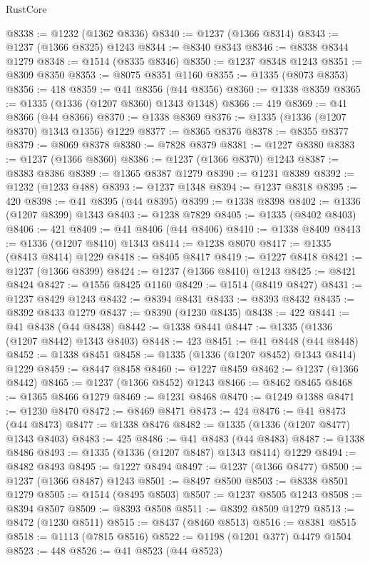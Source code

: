 \begin{lexlean}{RustCore}
\begin{coremodule}
@8338 := @1232 (@1362 @8336)
@8340 := @1237 (@1366 @8314)
@8343 := @1237 (@1366 @8325) @1243
@8344 := @8340 @8343
@8346 := @8338 @8344 @1279
@8348 := @1514 (@8335 @8346)
@8350 := @1237 @8348 @1243
@8351 := @8309 @8350
@8353 := @8075 @8351 @1160
@8355 := @1335 (@8073 @8353)
@8356 := 418
@8359 := @41 @8356 (@44 @8356)
@8360 := @1338 @8359
@8365 := @1335 (@1336 (@1207 @8360) @1343 @1348)
@8366 := 419
@8369 := @41 @8366 (@44 @8366)
@8370 := @1338 @8369
@8376 := @1335 (@1336 (@1207 @8370) @1343 @1356) @1229
@8377 := @8365 @8376
@8378 := @8355 @8377
@8379 := @8069 @8378
@8380 := @7828 @8379
@8381 := @1227 @8380
@8383 := @1237 (@1366 @8360)
@8386 := @1237 (@1366 @8370) @1243
@8387 := @8383 @8386
@8389 := @1365 @8387 @1279
@8390 := @1231 @8389
@8392 := @1232 (@1233 @488)
@8393 := @1237 @1348
@8394 := @1237 @8318
@8395 := 420
@8398 := @41 @8395 (@44 @8395)
@8399 := @1338 @8398
@8402 := @1336 (@1207 @8399) @1343
@8403 := @1238 @7829
@8405 := @1335 (@8402 @8403)
@8406 := 421
@8409 := @41 @8406 (@44 @8406)
@8410 := @1338 @8409
@8413 := @1336 (@1207 @8410) @1343
@8414 := @1238 @8070
@8417 := @1335 (@8413 @8414) @1229
@8418 := @8405 @8417
@8419 := @1227 @8418
@8421 := @1237 (@1366 @8399)
@8424 := @1237 (@1366 @8410) @1243
@8425 := @8421 @8424
@8427 := @1556 @8425 @1160
@8429 := @1514 (@8419 @8427)
@8431 := @1237 @8429 @1243
@8432 := @8394 @8431
@8433 := @8393 @8432
@8435 := @8392 @8433 @1279
@8437 := @8390 (@1230 @8435)
@8438 := 422
@8441 := @41 @8438 (@44 @8438)
@8442 := @1338 @8441
@8447 := @1335 (@1336 (@1207 @8442) @1343 @8403)
@8448 := 423
@8451 := @41 @8448 (@44 @8448)
@8452 := @1338 @8451
@8458 := @1335 (@1336 (@1207 @8452) @1343 @8414) @1229
@8459 := @8447 @8458
@8460 := @1227 @8459
@8462 := @1237 (@1366 @8442)
@8465 := @1237 (@1366 @8452) @1243
@8466 := @8462 @8465
@8468 := @1365 @8466 @1279
@8469 := @1231 @8468
@8470 := @1249 @1388
@8471 := @1230 @8470
@8472 := @8469 @8471
@8473 := 424
@8476 := @41 @8473 (@44 @8473)
@8477 := @1338 @8476
@8482 := @1335 (@1336 (@1207 @8477) @1343 @8403)
@8483 := 425
@8486 := @41 @8483 (@44 @8483)
@8487 := @1338 @8486
@8493 := @1335 (@1336 (@1207 @8487) @1343 @8414) @1229
@8494 := @8482 @8493
@8495 := @1227 @8494
@8497 := @1237 (@1366 @8477)
@8500 := @1237 (@1366 @8487) @1243
@8501 := @8497 @8500
@8503 := @8338 @8501 @1279
@8505 := @1514 (@8495 @8503)
@8507 := @1237 @8505 @1243
@8508 := @8394 @8507
@8509 := @8393 @8508
@8511 := @8392 @8509 @1279
@8513 := @8472 (@1230 @8511)
@8515 := @8437 (@8460 @8513)
@8516 := @8381 @8515
@8518 := @1113 (@7815 @8516)
@8522 := @1198 (@1201 @377) @4479 @1504
@8523 := 448
@8526 := @41 @8523 (@44 @8523)

\end{coremodule}
\end{lexlean}
